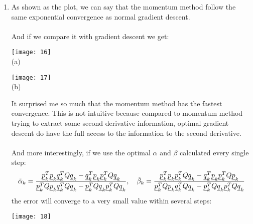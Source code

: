 \documentclass[11pt,letterpaper]{article}
\begin{document}
\begin{tcolorbox}
    \begin{enumerate}[\quad\quad]
        \item As shown as the plot, we can say that the momentum method follow the same exponential convergence as normal gradient descent. \\\\
        And if we compare it with gradient descent we get:
        \begin{center}
            \texttt{[image: 16]}\\
            (a)
        \end{center}
        \begin{center}
            \texttt{[image: 17]}\\
            (b)
        \end{center}
        It surprised me so much that the momentum method has the fastest convergence. This is not intuitive because compared to momentum method trying to extract some second derivative information, optimal gradient descent do have the full access to the information to the second derivative.
        \\\\
        And more interestingly, if we use the optimal $\alpha$ and $\beta$ calculated every single step:
         \begin{align*}
                \Tilde{\alpha}_k = \frac{\underline p_k^T \underline p_k \underline q_k^T Q \underline q_k - 
                \underline q_k^T \underline p_k \underline p_k^T Q \underline q_k}
                {\underline p_k^T Q \underline p_k \underline q_k^T Q \underline q_k - \underline p_k^T Q \underline q_k \underline p_k^T Q \underline q_k}, \quad
                \Tilde{\beta}_k = \frac{\underline p_k^T \underline p_k \underline p_k^T Q \underline q_k - 
                \underline q_k^T \underline p_k \underline p_k^T Q \underline p_k}
                {\underline p_k^T Q \underline p_k \underline q_k^T Q \underline q_k - \underline p_k^T Q \underline q_k \underline p_k^T Q \underline q_k}
        \end{align*}
        the error will converge to a very small value within several steps:
        \begin{center}
            \texttt{[image: 18]}
        \end{center}
    \end{enumerate}
\end{tcolorbox}
\end{document}
